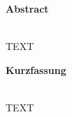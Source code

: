 	\begin{Huge}
		\textbf{Abstract}\vspace{12mm}
	\end{Huge}
\\
 TEXT
 \vspace{4cm}
 \\
 \begin{Huge}
 	\textbf{Kurzfassung}\vspace{12mm}
 \end{Huge}
\\
TEXT